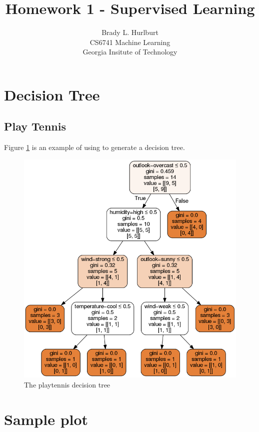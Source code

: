 \documentclass[11pt]{article}
\title{Homework 1 - Supervised Learning}
\author{
    Brady L. Hurlburt\\
    CS6741 Machine Learning\\
    Georgia Insitute of Technology\\
}
\makeatletter
\def\maxwidth{\ifdim\Gin@nat@width>\linewidth\linewidth
    \else\Gin@nat@width\fi}
\let\Oldincludegraphics\includegraphics
\renewcommand{\includegraphics}[1]{\Oldincludegraphics[width=.8\maxwidth]{#1}}
\makeatother
\begin{document}
    
    
    \maketitle
    
    

    
    
    
    
    
    \section{Decision Tree}\label{decision-tree}

    \subsection{Play Tennis}\label{play-tennis}

    Figure \ref{fig:tennistree} is an example of using \cite{scikit-learn}
to generate a decision tree.
    
    \begin{figure}[h!]
      \centering
      \includegraphics{img/tennis_tree.png}
      \caption{The playtennis decision tree}
      \label{fig:tennistree}
	\end{figure}
    \section{Sample plot}\label{sample-plot}
\end{document}
